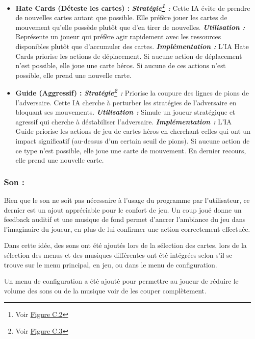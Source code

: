 \begin{itemize}
	\item \textbf{Hate Cards (Déteste les cartes) :}
        \subitem \textbf{\emph{Stratégie\footnote{Voir \hyperref[fig:hate1]{Figure C.2}} :}} Cette IA évite de prendre de nouvelles cartes autant que possible. Elle préfère jouer les cartes de mouvement qu'elle possède plutôt que d'en tirer de nouvelles.
		\subitem \textbf{\emph{Utilisation :}} Représente un joueur qui préfère agir rapidement avec les ressources disponibles plutôt que d'accumuler des cartes.
		\subitem \textbf{\emph{Implémentation :}} L'IA Hate Cards priorise les actions de déplacement. Si aucune action de déplacement n'est possible, elle joue une carte héros. Si aucune de ces actions n'est possible, elle prend une nouvelle carte.\\
	\item \textbf{Guide (Aggressif) :}
		\subitem \textbf{\emph{Stratégie\footnote{Voir \hyperref[fig:guide1]{Figure C.3}} :}} Priorise la coupure des lignes de pions de l'adversaire. Cette IA cherche à perturber les stratégies de l'adversaire en bloquant ses mouvements.
		\subitem \textbf{\emph{Utilisation :}} Simule un joueur stratégique et agressif qui cherche à déstabiliser l'adversaire.
		\subitem \textbf{\emph{Implémentation :}} L'IA Guide priorise les actions de jeu de cartes héros en cherchant celles qui ont un impact significatif (au-dessus d'un certain seuil de pions). Si aucune action de ce type n'est possible, elle joue une carte de mouvement. En dernier recours, elle prend une nouvelle carte.
\end{itemize}


\subsubsection*{Son :}
Bien que le son ne soit pas nécessaire à l’usage du programme par l’utilisateur, ce dernier est un ajout appréciable pour le confort de jeu. Un coup joué donne un feedback auditif et une musique de fond permet d’ancrer l’ambiance du jeu dans l’imaginaire du joueur, en plus de lui confirmer une action correctement effectuée.

Dans cette idée, des sons ont été ajoutés lors de la sélection des cartes, lors de la sélection des menus et des musiques différentes ont été intégrées selon s'il se trouve sur le menu principal, en jeu, ou dans le menu de configuration.

Un menu de configuration a été ajouté pour permettre au joueur de réduire le volume des sons ou de la musique voir de les couper complètement.


